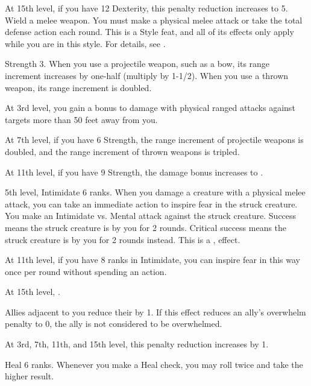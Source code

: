     At 15th level, if you have 12 Dexterity, this penalty reduction increases to 5.
    \stylereq Wield a melee weapon. You must make a physical melee attack or take the total defense action each round.
     This is a Style feat, and all of its effects only apply while you are in this style.
    For details, see .

    \featpre Strength 3.
    \featben When you use a projectile weapon, such as a bow, its range increment increases by one-half (multiply by 1-1/2).
    When you use a thrown weapon, its range increment is doubled.

    At 3rd level, you gain a  bonus to damage with physical ranged attacks against targets more than 50 feet away from you.

    At 7th level, if you have 6 Strength, the range increment of projectile weapons is doubled, and the range increment of thrown weapons is tripled.

    At 11th level, if you have 9 Strength, the damage bonus increases to .

    \featpres 5th level, Intimidate 6 ranks.
    \featben When you damage a creature with a physical melee attack, you can take an immediate action to inspire fear in the struck creature.
    You make an Intimidate vs. Mental attack against the struck creature.
    Success means the struck creature is \shaken by you for 2 rounds.
    Critical success means the struck creature is \frightened by you for 2 rounds instead.
    This is a ,  effect.

    At 11th level, if you have 8 ranks in Intimidate, you can inspire fear in this way once per round without spending an action.

    At 15th level, \tdash.

    \featben Allies adjacent to you reduce their  by 1.
    If this effect reduces an ally's overwhelm penalty to 0, the ally is not considered to be overwhelmed.

    At 3rd, 7th, 11th, and 15th level, this penalty reduction increases by 1.

    \featpre Heal 6 ranks.
    \featben Whenever you make a Heal check, you may roll twice and take the higher result.

